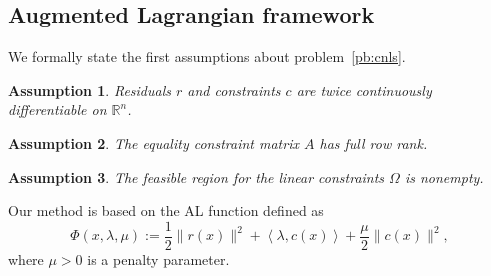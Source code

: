 \documentclass[pdflatex,sn-mathphys-num]{sn-jnl}%
\theoremstyle{thmstyleone}%
\newtheorem{assumption}{Assumption}
\newcommand{\RR}{{\mathbb{R}}} %
\newcommand{\inner}[2]{\left\langle {#1} , {#2} \right\rangle} %
\begin{document}
\subsection{Augmented Lagrangian framework}\label{subsec:al_framework}

We formally state the first assumptions about problem~\eqref{pb:cnls}.
\begin{assumption}\label{assumption:functions_C2}
	Residuals $r$ and constraints $c$ are twice continuously differentiable on $\RR^n$.
\end{assumption}
\begin{assumption}\label{assumption:full_rank_A}
	The equality constraint matrix $A$ has full row rank.
\end{assumption}
\begin{assumption}\label{assumption:feasible_linear_cons}
	The feasible region for the linear constraints $\Omega$ is nonempty.
\end{assumption}

Our method is based on the AL function defined as
\begin{equation}\label{eq:al}
	\Phi(x,\lambda,\mu) := \dfrac{1}{2}\|r(x)\|^2 + \inner{\lambda}{c(x)} + \dfrac{\mu}{2} \|c(x)\|^2,
\end{equation}
where $\mu > 0$ is a penalty parameter.
\end{document}
